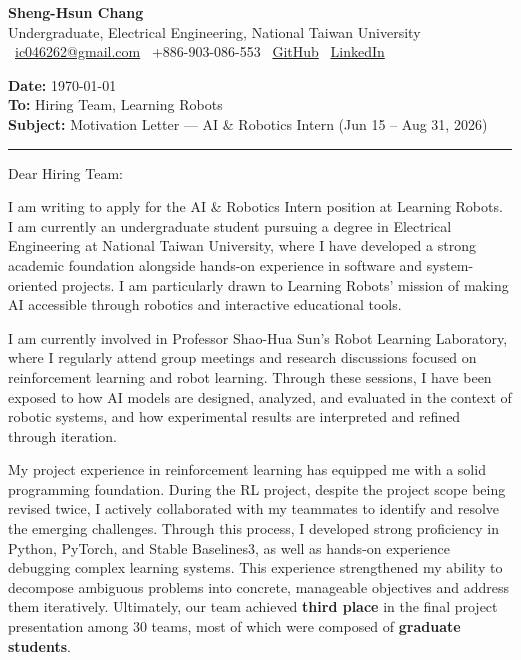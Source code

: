 \documentclass[12pt,a4paper]{article}
\makeatletter
\newcommand{\Name}{Sheng-Hsun Chang}
\newcommand{\Email}{\href{mailto:ic046262@gmail.com}{ic046262@gmail.com}}
\newcommand{\Phone}{+886-903-086-553}
\newcommand{\GitHub}{\href{https://github.com/}{GitHub}}
\newcommand{\LinkedIn}{\href{https://www.linkedin.com/}{LinkedIn}}
\makeatother
\begin{document}
{\LARGE \textbf{\Name}}\\
Undergraduate, Electrical Engineering, National Taiwan University\\
\vspace{2pt}
\faEnvelope\ \Email \quad
\faPhone\ \Phone \quad
\faGithub\ \GitHub \quad
\faLinkedin\ \LinkedIn

\vspace{14pt}

\textbf{Date:} \today\\
\textbf{To:} Hiring Team, Learning Robots\\
\textbf{Subject:} Motivation Letter --- AI \& Robotics Intern (Jun 15 -- Aug 31, 2026)


\vspace{10pt}
\hrule
Dear Hiring Team:

I am writing to apply for the AI \& Robotics Intern position at Learning Robots. 
I am currently an undergraduate student pursuing a degree in Electrical Engineering at 
National Taiwan University, where I have developed a strong academic foundation alongside 
hands-on experience in software and system-oriented projects. I am particularly drawn to 
Learning Robots' mission of making AI accessible through robotics and interactive educational tools.

I am currently involved in Professor Shao-Hua Sun's Robot Learning Laboratory, where I
regularly attend group meetings and research discussions focused on reinforcement learning
and robot learning. Through these sessions, I have been exposed to how AI models are
designed, analyzed, and evaluated in the context of robotic systems, and how experimental
results are interpreted and refined through iteration.

My project experience in reinforcement learning has equipped me with a solid programming foundation. 
During the RL project, despite the project scope being revised twice, I actively collaborated with my teammates to identify and resolve the emerging challenges. Through this process, I developed strong proficiency in Python, PyTorch, and Stable Baselines3, 
as well as hands-on experience debugging complex learning systems. 
This experience strengthened my ability to decompose ambiguous problems into concrete, manageable objectives and address them iteratively. 
Ultimately, our team achieved \textbf{third place} in the final project presentation among 30 teams, most of which were composed of \textbf{graduate students}.
\end{document}

